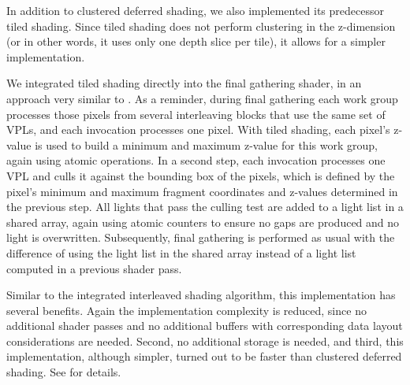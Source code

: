 In addition to clustered deferred shading, we also implemented its predecessor tiled shading. Since tiled shading does not perform clustering in the z-dimension (or in other words, it uses only one depth slice per tile), it allows for a simpler implementation.

We integrated tiled shading directly into the final gathering shader, in an approach very similar to \citet{Andersson:2011:RenderingBattlefield3}. As a reminder, during final gathering each work group processes those pixels from several interleaving blocks that use the same set of VPLs, and each invocation processes one pixel. With tiled shading, each pixel's z-value is used to build a minimum and maximum z-value for this work group, again using atomic operations. In a second step, each invocation processes one VPL and culls it against the bounding box of the pixels, which is defined by the pixel's minimum and maximum fragment coordinates and z-values determined in the previous step. All lights that pass the culling test are added to a light list in a shared array, again using atomic counters to ensure no gaps are produced and no light is overwritten. Subsequently, final gathering is performed as usual with the difference of using the light list in the shared array instead of a light list computed in a previous shader pass.

Similar to the integrated interleaved shading algorithm, this implementation has several benefits. Again the implementation complexity is reduced, since no additional shader passes and no additional buffers with corresponding data layout considerations are needed. Second, no additional storage is needed, and third, this implementation, although simpler, turned out to be faster than clustered deferred shading. See  for details.
